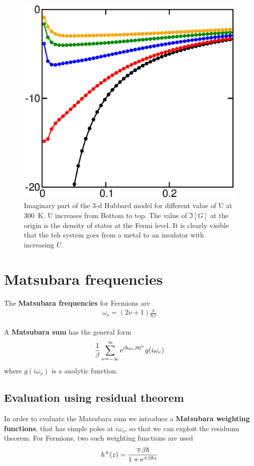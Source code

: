 \documentclass[11pt,a4paper]{report}
\begin{document}
\begin{figure}[h!]
\begin{center}
\includegraphics[width=0.3\linewidth]{Figs/hubimg.eps} %
\end{center}
\caption{\label{fig:hubimg} Imaginary part of the 3-d Hubbard model
  for different value of U at 300~K.  U increases from Bottom to
  top. The value of $\Im[G]$ at the origin is the density of states at
  the Fermi level. It is clearly visible that the teh system goes from
  a metal to an insulator with increasing $U$.}
\end{figure}




\appendix
\chapter{Matsubara frequencies}
\label{app:matsubarafreq}

The \textbf{Matsubara frequencies} for Fermions are
\begin{eqnarray*}
\omega_\nu=(2\nu+1)\frac{\pi}{\hbar\beta}
\end{eqnarray*}

A \textbf{Matsubara sum}
 has the general form
\begin{eqnarray*}
\frac{1}{\beta}\sum_{\nu=-\infty}^\infty\mathrm{e}^{i\hbar\omega_\nu\beta0^+} g(i\omega_\nu)
\end{eqnarray*}
where $g(i\omega_\nu)$ is a analytic function.

\section{Evaluation using residual theorem}
In order to evaluate the Matsubara sum we introduce a
\textbf{Matsubara weighting functions}, that has simple poles at $i\omega_\nu$, so that we can
exploit the residuum theorem. For Fermions, two such weighting
functions are used
\begin{eqnarray}
h^\pm(z)=\frac{\mp\beta\hbar}{1+\mathrm{e}^{\pm\beta\hbar z}}
\end{eqnarray}
\end{document}
